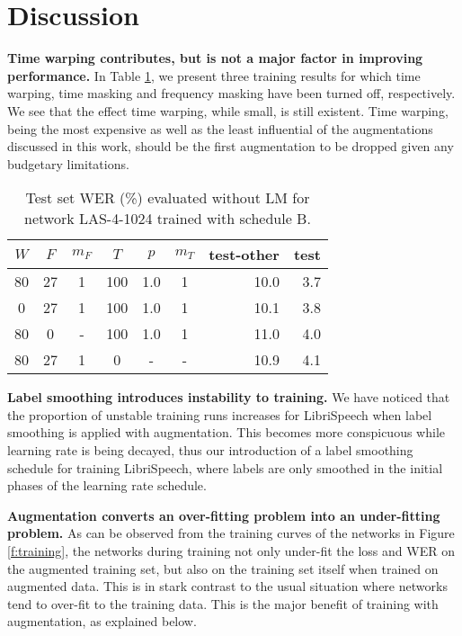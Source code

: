\section{Discussion}\label{s:discussion}

\noindent\textbf{Time warping contributes, but is not a major factor in improving performance.} In Table \ref{tab:abalation}, we present three training results for which time warping, time masking and frequency masking have been turned off, respectively. We see that the effect time warping, while small, is still existent. Time warping, being the most expensive as well as the least influential of the augmentations discussed in this work, should be the first augmentation to be dropped given any budgetary limitations.
\smallskip

\begin{table}[th]
  \vskip -0.1in
  \caption{Test set WER (\%) evaluated without LM for network LAS-4-1024 trained with schedule B.}
  \label{tab:abalation}
  \centering
  \footnotesize
  \begin{tabular}{ccccccrr}
    \toprule
    $W$ & $F$ & $m_F$ & $T$ & $p$ & $m_T$ & test-other & test \\
    \midrule
    80 & 27 & 1 & 100 & 1.0 & 1 & 10.0 & 3.7 \\
    \midrule
    0  & 27 & 1 & 100 & 1.0 & 1 & 10.1 & 3.8 \\
    80 &  0 & - & 100 & 1.0 & 1 & 11.0 & 4.0 \\
    80 & 27 & 1 & 0 & - & - & 10.9 & 4.1 \\
    \bottomrule
  \end{tabular}
  \vskip -0.1in
\end{table}

\noindent\textbf{Label smoothing introduces instability to training.} We have noticed that the proportion of unstable training runs increases for LibriSpeech when label smoothing is applied with augmentation. This becomes more conspicuous while learning rate is being decayed, thus our introduction of a label smoothing schedule for training LibriSpeech, where labels are only smoothed in the initial phases of the learning rate schedule.
\smallskip

\noindent\textbf{Augmentation converts an over-fitting problem into an under-fitting problem.} As can be observed from the training curves of the networks in Figure \ref{f:training}, the networks during training not only under-fit the loss and WER on the augmented training set, but also on the training set itself when trained on augmented data. This is in stark contrast to the usual situation where networks tend to over-fit to the training data. This is the major benefit of training with augmentation, as explained below.
\smallskip

